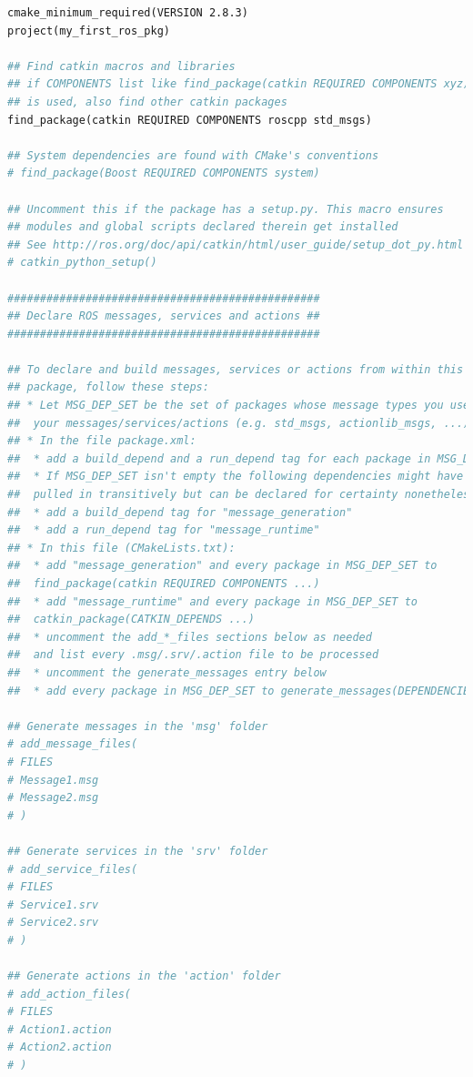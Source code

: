 \begin{lstlisting}[language=make]
cmake_minimum_required(VERSION 2.8.3)
project(my_first_ros_pkg)

## Find catkin macros and libraries
## if COMPONENTS list like find_package(catkin REQUIRED COMPONENTS xyz)
## is used, also find other catkin packages
find_package(catkin REQUIRED COMPONENTS roscpp std_msgs)

## System dependencies are found with CMake's conventions
# find_package(Boost REQUIRED COMPONENTS system)

## Uncomment this if the package has a setup.py. This macro ensures
## modules and global scripts declared therein get installed
## See http://ros.org/doc/api/catkin/html/user_guide/setup_dot_py.html
# catkin_python_setup()

################################################
## Declare ROS messages, services and actions ##
################################################

## To declare and build messages, services or actions from within this
## package, follow these steps:
## * Let MSG_DEP_SET be the set of packages whose message types you use in
##  your messages/services/actions (e.g. std_msgs, actionlib_msgs, ...).
## * In the file package.xml:
##  * add a build_depend and a run_depend tag for each package in MSG_DEP_SET
##  * If MSG_DEP_SET isn't empty the following dependencies might have been
##  pulled in transitively but can be declared for certainty nonetheless:
##  * add a build_depend tag for "message_generation"
##  * add a run_depend tag for "message_runtime"
## * In this file (CMakeLists.txt):
##  * add "message_generation" and every package in MSG_DEP_SET to
##  find_package(catkin REQUIRED COMPONENTS ...)
##  * add "message_runtime" and every package in MSG_DEP_SET to
##  catkin_package(CATKIN_DEPENDS ...)
##  * uncomment the add_*_files sections below as needed
##  and list every .msg/.srv/.action file to be processed
##  * uncomment the generate_messages entry below
##  * add every package in MSG_DEP_SET to generate_messages(DEPENDENCIES ...)

## Generate messages in the 'msg' folder
# add_message_files(
# FILES
# Message1.msg
# Message2.msg
# )

## Generate services in the 'srv' folder
# add_service_files(
# FILES
# Service1.srv
# Service2.srv
# )

## Generate actions in the 'action' folder
# add_action_files(
# FILES
# Action1.action
# Action2.action
# )


\end{lstlisting}
